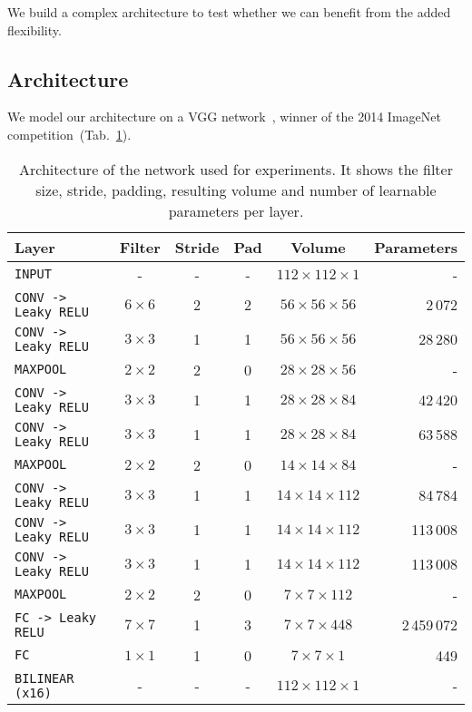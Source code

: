 We build a complex architecture to test whether we can benefit from the added flexibility.

\subsection{Architecture}
\label{subsec:Architecture1}
We model our architecture on a VGG network~\cite{Simonyan2014}, winner of the 2014 ImageNet competition~(Tab.~\ref{tab:convNetArchitecture1}).
\begin{table}[h]
	\centering
	\begin{tabular}{lccccr}
	\hline
	\textbf{Layer} & \textbf{Filter} & \textbf{Stride} &\textbf{Pad} & \textbf{Volume} & \textbf{Parameters} \\
	\hline
	\texttt{INPUT}	& -	& - & - & $112 \times 112 \times 1$ & -\\
	\texttt{CONV -> Leaky RELU} & $6 \times 6$ & 2 & 2 & $56 \times 56 \times 56$ & 2\,072\\
	\texttt{CONV -> Leaky RELU} & $3 \times 3$ & 1 & 1 & $56 \times 56 \times 56$ & 28\,280\\
	\texttt{MAXPOOL} & $2 \times 2$ & 2 & 0 & $28 \times 28 \times 56$ & -\\
	\texttt{CONV -> Leaky RELU} & $3 \times 3$ & 1 & 1 & $28 \times 28 \times 84$ & 42\,420\\
	\texttt{CONV -> Leaky RELU} & $3 \times 3$ & 1 & 1 & $28 \times 28 \times 84$ & 63\,588\\
	\texttt{MAXPOOL} & $2 \times 2$ & 2 & 0 & $14 \times 14 \times 84$ & -\\
	\texttt{CONV -> Leaky RELU} & $3 \times 3$ & 1 & 1 & $14 \times 14 \times 112$ & 84\,784\\
	\texttt{CONV -> Leaky RELU} & $3 \times 3$ & 1 & 1 & $14 \times 14 \times 112$ & 113\,008\\
	\texttt{CONV -> Leaky RELU} & $3 \times 3$ & 1 & 1 & $14 \times 14 \times 112$ & 113\,008\\
	\texttt{MAXPOOL} & $2 \times 2$ & 2 & 0 & $7 \times 7 \times 112$ & -\\
	\texttt{FC -> Leaky RELU} & $7 \times 7$ & 1 & 3 & $7 \times 7 \times 448$ & 2\,459\,072\\
	\texttt{FC} & $1 \times 1$ & 1 & 0 & $7 \times 7 \times 1$ & 449 \\
	\texttt{BILINEAR (x16)} & - & - & - & $112 \times 112 \times 1$ & -\\
	\hline
	\end{tabular}
	\caption[Selected convolutional network architecture]{Architecture of the network used for experiments. It shows the filter size, stride, padding, resulting volume and number of learnable parameters per layer.}
	\label{tab:convNetArchitecture1}
\end{table}


